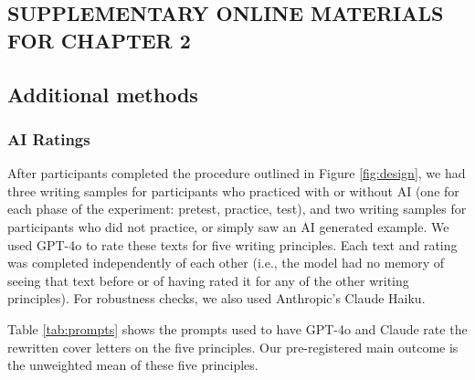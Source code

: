 \documentclass[11pt]{report}
\begin{document}
\begin{append}
\chapter{\MakeUppercase{Supplementary Online Materials for Chapter 2}}
\section{Additional methods}

\subsection{AI Ratings}
After participants completed the procedure outlined in Figure \ref{fig:design}, we had three writing samples for participants who practiced with or without AI (one for each phase of the experiment: pretest, practice, test), and two writing samples for participants who did not practice, or simply saw an AI generated example. We used GPT-4o to rate these texts for five writing principles. Each text and rating was completed independently of each other (i.e., the model had no memory of seeing that text before or of having rated it for any of the other writing principles). For robustness checks, we also used Anthropic's Claude Haiku.

Table \ref{tab:prompts} shows the prompts used to have GPT-4o and Claude rate the rewritten cover letters on the five principles. Our pre-registered main outcome is the unweighted mean of these five principles.


\end{append}
\end{document}
